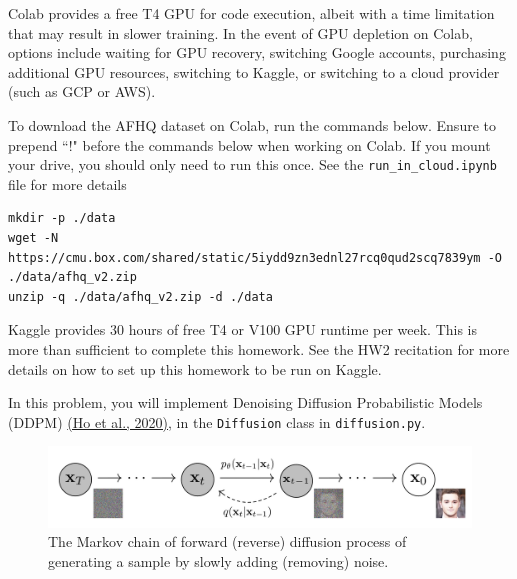 \documentclass[11pt,addpoints,answers]{exam}
\begin{document}
\begin{questions}
\pagebreak

Colab provides a free T4 GPU for code execution, albeit with a time limitation that may result in slower training. In the event of GPU depletion on Colab, options include waiting for GPU recovery, switching Google accounts, purchasing additional GPU resources, switching to Kaggle, or switching to a cloud provider (such as GCP or AWS).

To download the AFHQ dataset on Colab, run the commands below. Ensure to prepend ``!" before the commands below when working on Colab. If you mount your drive, you should only need to run this once. See the \lstinline{run_in_cloud.ipynb} file for more details

\lstset{breaklines=true}


\begin{lstlisting}
mkdir -p ./data
wget -N https://cmu.box.com/shared/static/5iydd9zn3ednl27rcq0qud2scq7839ym -O ./data/afhq_v2.zip
unzip -q ./data/afhq_v2.zip -d ./data
\end{lstlisting}

Kaggle provides 30 hours of free T4 or V100 GPU runtime per week. This is more than sufficient to complete this homework. See the HW2 recitation for more details on how to set up this homework to be run on Kaggle.



    In this problem, you will implement Denoising Diffusion Probabilistic Models (DDPM) \href{https://prompt-to-prompt.github.io/ptp_files/Prompt-to-Prompt_preprint.pdf}{(Ho et al., 2020)}, in the \lstinline{Diffusion} class in \lstinline{diffusion.py}. 
    
    \begin{figure}[H]
        \centering
        \includegraphics[width=.9\linewidth]{fig/diffusion_model.png}
        \caption{The Markov chain of forward (reverse) diffusion process of generating a sample by slowly adding (removing) noise.}
        \label{fig:diffusion}
    \end{figure}


\end{questions}
\end{document}
